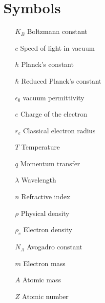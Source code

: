 \section*{Symbols}

\begin{itemize}
        \item[$K_B$] Boltzmann constant
        \item[$c$] Speed of light in vacuum        
        \item[$h$] Planck's constant  
        \item[$\hbar$] Reduced Planck's constant  
        \item[$\epsilon_0$] vacuum permittivity 
        \item[$e$] Charge of the electron  
        \item[$r_e$] Classical electron radius  
        \item[$T$] Temperature  
        \item[$q$] Momentum transfer  
        \item[$\lambda$] Wavelength  
        \item[$n$] Refractive index
        \item[$\rho$] Physical density  
        \item[$\rho_e$] Electron density
        \item[$N_A$] Avogadro constant
        \item[$m$] Electron mass
        \item[$A$] Atomic mass
        \item[$Z$] Atomic number
\end{itemize}

\cleardoublepage
